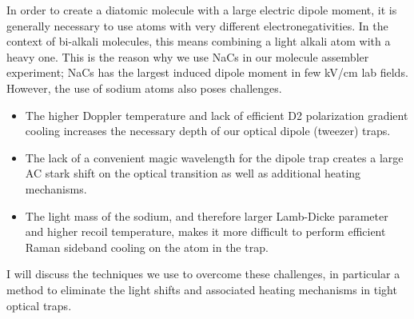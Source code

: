 \documentclass{article}
\begin{document}
In order to create a diatomic molecule with a large electric dipole moment,
it is generally necessary to use atoms with very different electronegativities.
In the context of bi-alkali molecules,
this means combining a light alkali atom with a heavy one.
This is the reason why we use NaCs in our molecule assembler experiment;
NaCs has the largest induced dipole moment in few kV/cm lab fields.
However, the use of sodium atoms also poses challenges.
\begin{itemize}
\item The higher Doppler temperature and lack of efficient D2 polarization
  gradient cooling increases the necessary depth of our optical dipole
  (tweezer) traps.
\item The lack of a convenient magic wavelength for the dipole trap
  creates a large AC stark shift on the optical transition as well as
  additional heating mechanisms.
\item The light mass of the sodium, and therefore larger Lamb-Dicke
  parameter and higher recoil temperature, makes it more difficult to
  perform efficient Raman sideband cooling on the atom in the trap.
\end{itemize}
I will discuss the techniques we use to overcome these challenges,
in particular a method to eliminate the light shifts and associated heating
mechanisms in tight optical traps.
\end{document}
